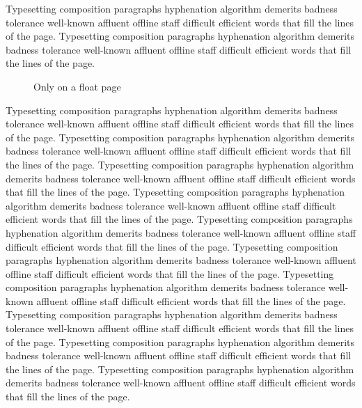 \documentclass[12pt]{report}
\begin{document}
Typesetting composition paragraphs hyphenation algorithm demerits badness tolerance well-known affluent offline staff difficult efficient words that fill the lines of the page. Typesetting composition paragraphs hyphenation algorithm demerits badness tolerance well-known affluent offline staff difficult efficient words that fill the lines of the page.

\begin{figure}[p]
\vspace{200pt}
\caption{Only on a float page}
\end{figure}

\begin{table}[p]
\vspace{150pt}
\caption{Another one}
\end{table}

Typesetting composition paragraphs hyphenation algorithm demerits badness tolerance well-known affluent offline staff difficult efficient words that fill the lines of the page. Typesetting composition paragraphs hyphenation algorithm demerits badness tolerance well-known affluent offline staff difficult efficient words that fill the lines of the page. Typesetting composition paragraphs hyphenation algorithm demerits badness tolerance well-known affluent offline staff difficult efficient words that fill the lines of the page. Typesetting composition paragraphs hyphenation algorithm demerits badness tolerance well-known affluent offline staff difficult efficient words that fill the lines of the page. Typesetting composition paragraphs hyphenation algorithm demerits badness tolerance well-known affluent offline staff difficult efficient words that fill the lines of the page. Typesetting composition paragraphs hyphenation algorithm demerits badness tolerance well-known affluent offline staff difficult efficient words that fill the lines of the page. Typesetting composition paragraphs hyphenation algorithm demerits badness tolerance well-known affluent offline staff difficult efficient words that fill the lines of the page. Typesetting composition paragraphs hyphenation algorithm demerits badness tolerance well-known affluent offline staff difficult efficient words that fill the lines of the page. Typesetting composition paragraphs hyphenation algorithm demerits badness tolerance well-known affluent offline staff difficult efficient words that fill the lines of the page. Typesetting composition paragraphs hyphenation algorithm demerits badness tolerance well-known affluent offline staff difficult efficient words that fill the lines of the page.
\end{document}
